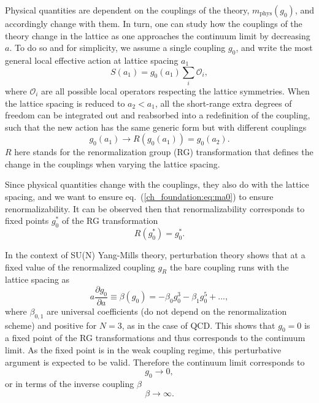 Physical quantities are dependent on the couplings of the theory, $m_{\textrm{phys}}(g_0)$, and accordingly change with them. In turn, one can study how the couplings of the theory change in the lattice as one approaches the continuum limit by decreasing $a$. To do so and for simplicity, we assume a single coupling $g_0$, and write the most general local effective action at lattice spacing $a_1$
\begin{equation}
S(a_1)=g_0(a_1)\sum_i\mathcal{O}_i,
\end{equation}
where $\mathcal{O}_i$ are all possible local operators respecting the lattice symmetries. When the lattice spacing is reduced to $a_2<a_1$, all the short-range extra degrees of freedom can be integrated out and reabsorbed into a redefinition of the coupling, such that the new action has the same generic form but with different couplings
\begin{equation}
g_0(a_1)\rightarrow R(g_0(a_1))=g_0(a_2).
\end{equation}
$R$ here stands for the renormalization group (RG) transformation that defines the change in the couplings when varying the lattice spacing.

Since physical quantities change with the couplings, they also do with the lattice spacing, and we want to ensure eq.~(\ref{ch_foundation:eq:ma0}) to ensure renormalizability. It can be observed then that renormalizability corresponds to fixed points $g_0^*$ of the RG transformation
\begin{equation}
R(g_0^*)=g_0^*.
\end{equation}

In the context of SU(N) Yang-Mills theory, perturbation theory shows that at a fixed value of the renormalized coupling $g_R$ the bare coupling runs with the lattice spacing as
\begin{equation}
\label{ch_foundation:eq:beta-func}
a\frac{\partial g_0}{\partial a}\equiv\beta(g_0)=-\beta_0g_0^3-\beta_1g_0^5+...,
\end{equation}
where $\beta_{0,1}$ are universal coefficients (do not depend on the renormalization scheme) and positive for $N=3$, as in the case of QCD. This shows that $g_0=0$ is a fixed point of the RG transformations and thus corresponds to the continuum limit. As the fixed point is in the weak coupling regime, this perturbative argument is expected to be valid. Therefore the continuum limit corresponds to
\begin{equation}
g_0\rightarrow0,
\end{equation}
or in terms of the inverse coupling $\beta$
\begin{equation}
\beta\rightarrow\infty.
\end{equation}

